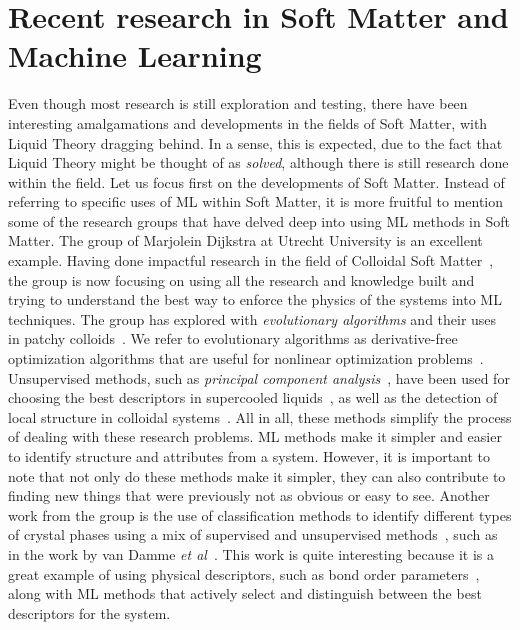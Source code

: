\section{Recent research in Soft Matter and Machine Learning}
Even though most research is still exploration and testing, there have been interesting
amalgamations and developments in the fields of Soft Matter, with Liquid Theory dragging
behind. In a sense, this is expected, due to the fact that Liquid Theory might be thought
of as \emph{solved}, although there is still research done within the field.
Let us focus first on the developments of Soft Matter. Instead of referring to specific
uses of ML within Soft Matter, it is more fruitful to mention some of the research groups
that have delved deep into using ML methods in Soft Matter. The group of Marjolein
Dijkstra at Utrecht University is an excellent example. Having done impactful research
in the field of Colloidal Soft Matter~\cite{dijkstraPhaseDiagramHighly1999,leunissenIonicColloidalCrystals2005},
the group is now focusing on using all the research and knowledge built and trying to
understand the best way to enforce the physics of the systems into ML techniques.
The group has explored with \emph{evolutionary algorithms} and their uses in patchy
colloids~\cite{bianchiPredictingPatchyParticle2012}. We refer to evolutionary algorithms as
derivative-free optimization algorithms that are useful for nonlinear optimization
problems~\cite{yuIntroductionEvolutionaryAlgorithms2010}.
Unsupervised methods, such as \emph{principal component analysis}~\cite{hastieElementsStatisticalLearning2009},
have been used for choosing the best descriptors in supercooled liquids~\cite{boattiniAveragingLocalStructure2021},
as well as the detection of local structure in colloidal systems~\cite{boattiniUnsupervisedLearningLocal2019a}.
All in all, these methods simplify the process of dealing with these research problems.
ML methods make it simpler and easier to identify structure and attributes from a
system. However, it is important to note that not only do these methods make it simpler,
they can also contribute to finding new things that were previously not as obvious or easy
to see.
Another work from the group is the use of classification methods 
to identify different types of crystal phases using
a mix of supervised and unsupervised methods~\cite{hastieElementsStatisticalLearning2009},
such as in the work by van Damme \emph{et al}~\cite{vandammeClassifyingCrystalsRounded2020}.
This work is quite interesting because it is a great example of using physical descriptors,
such as bond order parameters~\cite{steinhardtBondorientationalOrderLiquids1983,lechnerAccurateDeterminationCrystal2008},
along with ML methods that actively select and distinguish between the best descriptors
for the system.

